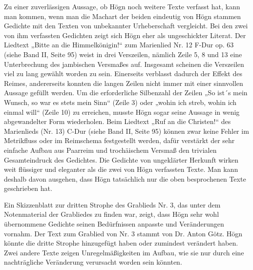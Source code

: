 Zu einer zuverlässigen Aussage, ob Högn noch weitere Texte verfasst hat,
kann man kommen, wenn man die Machart der beiden eindeutig von Högn
stammen Gedichte mit den Texten von unbekannter Urheberschaft
vergleicht. Bei den zwei von ihm verfassten Gedichten zeigt sich Högn
eher als ungeschickter Literat. Der Liedtext „Bitte an die
Himmelkönigin!“ zum Marienlied Nr. 12 F-Dur op. 63 (siehe Band II,
Seite 95) weist in drei Verszeilen, nämlich Zeile 5, 8 und 13 eine
Unterbrechung des jambischen Versmaßes auf. Insgesamt scheinen die
Verszeilen viel zu lang gewählt worden zu sein. Einerseits verblasst
dadurch der Effekt des Reimes, andererseits konnten die langen Zeilen
nicht immer mit einer sinnvollen Aussage gefüllt werden. Um die
erforderliche Silbenzahl der Zeilen „So ist´s mein Wunsch, so war es
stets mein Sinn“ (Zeile 3) oder „wohin ich streb, wohin ich einmal
will“ (Zeile 10) zu erreichen, musste Högn sogar seine Aussage in wenig
abgewandelter Form wiederholen. Beim Liedtext „Ruf an die Christen!“
des Marienlieds (Nr. 13) C-Dur (siehe Band II, Seite 95) können zwar
keine Fehler im Metrikfluss oder im Reimschema festgestellt werden,
dafür verstärkt der sehr einfache Aufbau aus Paarreim und trochäischem
Versmaß den trivialen Gesamteindruck des Gedichtes. Die Gedichte von
ungeklärter Herkunft wirken weit flüssiger und eleganter als die zwei
von Högn verfassten Texte. Man kann deshalb davon ausgehen, dass Högn
tatsächlich nur die oben besprochenen Texte geschrieben hat.

Ein Skizzenblatt zur dritten Strophe des Grablieds Nr. 3, das unter dem
Notenmaterial der Grabliedes zu finden war, zeigt, dass Högn sehr wohl
übernommene Gedichte seinen Bedürfnissen anpasste und Veränderungen
vornahm. Der Text zum Grablied von Nr. 3 stammt von Dr. Anton Götz.
Högn könnte die dritte Strophe hinzugefügt haben oder zumindest
verändert haben. Zwei andere Texte zeigen Unregelmäßigkeiten im Aufbau,
wie sie nur durch eine nachträgliche Veränderung verursacht worden sein
könnten.

